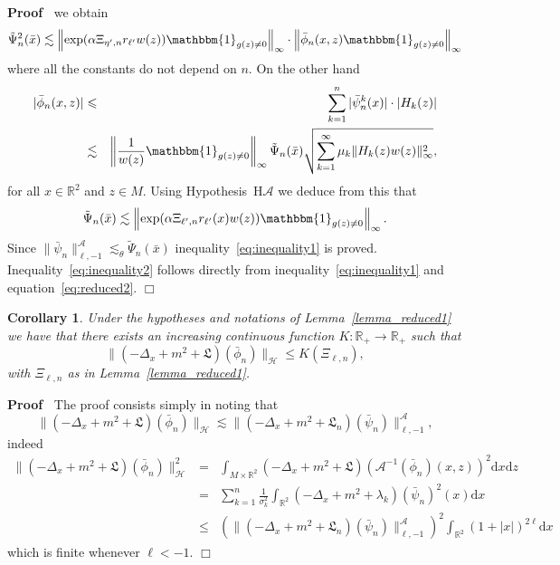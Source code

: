 \documentclass[a4paper,10pt]{article}
\newcommand{\mathd}{\mathrm{d}}
\newenvironment{proof}{\noindent\textbf{Proof\ }}{\hspace*{\fill}$\Box$\medskip}
\newtheorem{corollary}{Corollary}
\begin{document}
\begin{proof}
  we obtain
  \[ \tilde{\Psi}_n^2 (\bar{x}) \lesssim \left\| \exp (\alpha \Xi_{\eta', n}
     r_{\ell'} w (z)) \mathbbm{1}_{g (z) \not{=} 0} \right\|_{\infty} \cdot
     \left\| \bar{\phi}_n (x, z) \mathbbm{1}_{g (z) \not{=} 0}
     \right\|_{\infty} \]
  where all the constants do not depend on $n$. On the other hand
  \begin{eqnarray*}
    | \bar{\phi}_n (x, z) | & \leqslant & \sum_{k = 1}^n | \bar{\psi}_n^k (x)
    | \cdot | H_k (z) |\\
    & \lesssim & \left\| \frac{1}{w (z)} \mathbbm{1}_{g (z) \not{=} 0}
    \right\|_{\infty} \tilde{\Psi}_n (\bar{x}) \sqrt{\sum_{k = 1}^{\infty}
    \mu_k \| H_k (z) w (z) \|_{\infty}^2},
  \end{eqnarray*}
  for all $x \in \mathbb{R}^2$ and $z \in M$. Using Hypothesis~H$\mathcal{A}$
  we deduce from this that
  \[ \tilde{\Psi}_n (\bar{x}) \lesssim \left\| \exp (\alpha \Xi_{\ell', n}
     r_{\ell'} (x) w (z)) \mathbbm{1}_{g (z) \not{=} 0} \right\|_{\infty} . \]
  Since $\| \bar{\psi}_n \|^{\mathcal{A}}_{\ell, - 1} \lesssim_{\theta}
  \tilde{\Psi}_n (\bar{x})$ inequality~{\eqref{eq:inequality1}} is proved.
  Inequality~{\eqref{eq:inequality2}} follows directly from
  inequality~{\eqref{eq:inequality1}} and equation~{\eqref{eq:reduced2}}.
\end{proof}

\begin{corollary}
  \label{corollary_reduced1}Under the hypotheses and notations of
  Lemma~\ref{lemma_reduced1} we have that there exists an increasing
  continuous function $K : \mathbb{R}_+ \rightarrow \mathbb{R}_+$ such that
  \[ \| (- \Delta_x + m^2 + \mathfrak{L}) (\bar{\phi}_n) \|_{\mathcal{H}}
     \leqslant K (\Xi_{\ell, n}), \]
  with $\Xi_{\ell, n}$ as in Lemma~\ref{lemma_reduced1}.
\end{corollary}

\begin{proof}
  The proof consists simply in noting that
  \[ \| (- \Delta_x + m^2 + \mathfrak{L}) (\bar{\phi}_n) \|_{\mathcal{H}}
     \lesssim \| (- \Delta_x + m^2 + \mathfrak{L}_n) (\bar{\psi}_n)
     \|^{\mathcal{A}}_{\ell, - 1}, \]
  indeed
  \begin{eqnarray*}
    \| (- \Delta_x + m^2 + \mathfrak{L}) (\bar{\phi}_n) \|_{\mathcal{H}}^2 & =
    & \int_{M \times \mathbb{R}^2} (- \Delta_x + m^2 + \mathfrak{L})
    (\mathcal{A}^{- 1} (\bar{\phi}_n) (x, z))^2 \mathd x \mathd z\\
    & = & \sum_{k = 1}^n \frac{1}{\sigma_k^2} \int_{\mathbb{R}^2} (- \Delta_x
    + m^2 + \lambda_k) (\bar{\psi}_n)^2 (x) \mathd x\\
    & \leqslant & (\| (- \Delta_x + m^2 + \mathfrak{L}_n) (\bar{\psi}_n)
    \|^{\mathcal{A}}_{\ell, - 1})^2 \int_{\mathbb{R}^2} (1 + | x |)^{2 \ell}
    \mathd x
  \end{eqnarray*}
  which is finite whenever $\ell < - 1$.
\end{proof}
\end{document}
